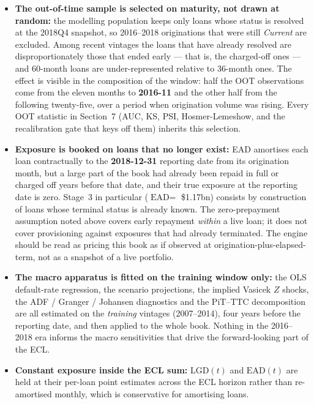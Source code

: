 \documentclass[11pt,a4paper]{article}
\begin{document}
\begin{itemize}
    \item \textbf{The out-of-time sample is selected on maturity, not drawn at random:} the modelling population keeps only loans whose status is resolved at the 2018Q4 snapshot, so 2016--2018 originations that were still \emph{Current} are excluded. Among recent vintages the loans that have already resolved are disproportionately those that ended early --- that is, the charged-off ones --- and 60-month loans are under-represented relative to 36-month ones. The effect is visible in the composition of the window: half the OOT observations come from the eleven months to \textbf{2016-11} and the other half from the following twenty-five, over a period when origination volume was rising. Every OOT statistic in Section~7 (AUC, KS, PSI, Hosmer-Lemeshow, and the recalibration gate that keys off them) inherits this selection.
    \item \textbf{Exposure is booked on loans that no longer exist:} EAD amortises each loan contractually to the \textbf{2018-12-31} reporting date from its origination month, but a large part of the book had already been repaid in full or charged off years before that date, and their true exposure at the reporting date is zero. Stage~3 in particular ($\text{EAD} =$ \$1.17bn) consists by construction of loans whose terminal status is already known. The zero-prepayment assumption noted above covers early repayment \emph{within} a live loan; it does not cover provisioning against exposures that had already terminated. The engine should be read as pricing this book as if observed at origination-plus-elapsed-term, not as a snapshot of a live portfolio.
    \item \textbf{The macro apparatus is fitted on the training window only:} the OLS default-rate regression, the scenario projections, the implied Vasicek $Z$ shocks, the ADF / Granger / Johansen diagnostics and the PiT--TTC decomposition are all estimated on the \emph{training} vintages (2007--2014), four years before the reporting date, and then applied to the whole book. Nothing in the 2016--2018 era informs the macro sensitivities that drive the forward-looking part of the ECL.
    \item \textbf{Constant exposure inside the ECL sum:} $\text{LGD}(t)$ and $\text{EAD}(t)$ are held at their per-loan point estimates across the ECL horizon rather than re-amortised monthly, which is conservative for amortising loans.

\end{itemize}
\end{document}
